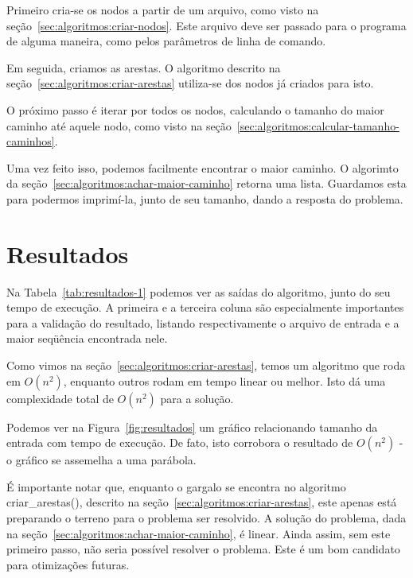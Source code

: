 \documentclass[12pt]{article}
\begin{document}
Primeiro cria-se os nodos a partir de um arquivo, como visto na se\c{c}ão~\ref{sec:algoritmos:criar-nodos}. Este arquivo deve ser passado para o programa de alguma maneira, como pelos parâmetros de linha de comando.

Em seguida, criamos as arestas. O algoritmo descrito na se\c{c}ão~\ref{sec:algoritmos:criar-arestas} utiliza-se dos nodos já criados para isto.

O próximo passo é iterar por todos os nodos, calculando o tamanho do maior caminho até aquele nodo, como visto na se\c{c}ão~\ref{sec:algoritmos:calcular-tamanho-caminhos}.

Uma vez feito isso, podemos facilmente encontrar o maior caminho. O algorimto da se\c{c}ão~\ref{sec:algoritmos:achar-maior-caminho} retorna uma lista. Guardamos esta para podermos imprimí-la, junto de seu tamanho, dando a resposta do problema.

\section{Resultados}\label{sec:resultados}

Na Tabela~\ref{tab:resultados-1} podemos ver as saídas do algoritmo, junto do seu tempo de execu\c{c}ão. A primeira e a terceira coluna são especialmente importantes para a valida\c{c}ão do resultado, listando respectivamente o arquivo de entrada e a maior seqüência encontrada nele.

Como vimos na se\c{c}ão~\ref{sec:algoritmos:criar-arestas}, temos um algoritmo que roda em $O(n^2)$, enquanto outros rodam em tempo linear ou melhor. Isto dá uma complexidade total de $O(n^2)$ para a solu\c{c}ão.

Podemos ver na Figura~\ref{fig:resultados} um gráfico relacionando tamanho da entrada com tempo de execu\c{c}ão. De fato, isto corrobora o resultado de $O(n^2)$ - o gráfico se assemelha a uma parábola.

É importante notar que, enquanto o gargalo se encontra no algoritmo {\sf criar\_arestas()}, descrito na se\c{c}ão~\ref{sec:algoritmos:criar-arestas}, este apenas está preparando o terreno para o problema ser resolvido. A solu\c{c}ão do problema, dada na se\c{c}ão~\ref{sec:algoritmos:achar-maior-caminho}, é linear. Ainda assim, sem este primeiro passo, não seria possível resolver o problema. Este é um bom candidato para otimiza\c{c}ões futuras.
\end{document}
